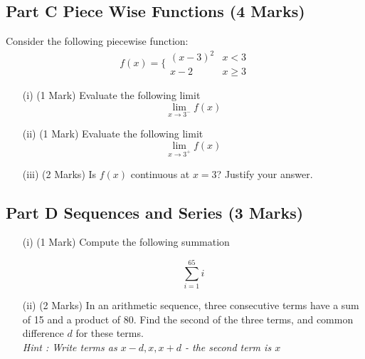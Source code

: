 \documentclass[]{article}
\begin{document}
\subsection*{Part C Piece Wise Functions (4 Marks)}
Consider the following piecewise function:
\[
f(x) = 
\bigg \{ 
\begin{array}{cc}
(x-3)^2 &  x <3 \\ 
x-2 & x \geq 3
\end{array} 
\]

\begin{itemize}
\item[(i)] (1 Mark) Evaluate the following limit \[\lim_{x \to 3^{-} } f(x) \]
\item[(ii)] (1 Mark) Evaluate the following limit \[\lim_{x \to 3^{+} } f(x) \]
\item[(iii)] (2 Marks) Is $f(x)$
continuous at $x=3$? Justify your answer.
\end{itemize}

	
\newpage


\subsection*{Part D Sequences and Series (3 Marks)}

\begin{enumerate}
	\item[(i)](1 Mark)  Compute the following summation
	
	\[ \sum_{i=1}^{65} i \]
	
%		
%		
%		
%		
		\item[(ii)] (2 Marks)
		In an arithmetic sequence, three consecutive terms have a sum of 15 and a product of 80.
		Find the second of the three terms, and common difference $d$ for these terms.
		\\
		\textit{Hint : Write terms as $x-d,x,x+d$  - the second term is $x$}
\end{enumerate}
%
%
%
\end{document}
